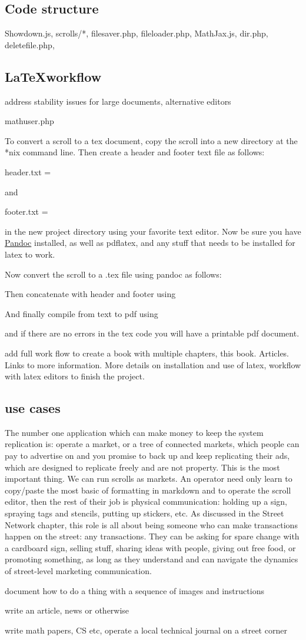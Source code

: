 \subsection{Code structure}\label{code-structure}

Showdown.js, scrolls/*, filesaver.php, fileloader.php, MathJax.js,
dir.php, deletefile.php,

\subsection{\LaTeX workflow}\label{latex-workflow}

address stability issues for large documents, alternative editors

mathuser.php

To convert a scroll to a tex document, copy the scroll into a new
directory at the *nix command line. Then create a header and footer text
file as follows:

header.txt =

and

footer.txt =

in the new project directory using your favorite text editor. Now be
sure you have \href{https://pandoc.org/}{Pandoc} installed, as well as
pdflatex, and any stuff that needs to be installed for latex to work.

Now convert the scroll to a .tex file using pandoc as follows:

Then concatenate with header and footer using

And finally compile from text to pdf using

and if there are no errors in the tex code you will have a printable pdf
document.

add full work flow to create a book with multiple chapters, this book.
Articles. Links to more information. More details on installation and
use of latex, workflow with latex editors to finish the project.

\subsection{use cases}

The number one application which can make money to keep the system replication is: operate a market, or a tree of connected markets, which people can pay to advertise on and you promise to back up and keep replicating their ads, which are designed to replicate freely and are not property.  This is the most important thing.  We can run scrolls as markets.  An operator need only learn to copy/paste the most basic of formatting in markdown and to operate the scroll editor, then the rest of their job is physical communication: holding up a sign, spraying tags and stencils, putting up stickers, etc.  As discussed in the Street Network chapter, this role is all about being someone who can make transactions happen on the street: any transactions.  They can be asking for spare change with a cardboard sign, selling stuff, sharing ideas with people, giving out free food, or promoting something, as long as they understand and can navigate the dynamics of street-level marketing communication.

document how to do a thing with a sequence of images and instructions

write an article, news or otherwise


write math papers, CS etc, operate a local technical journal on a street corner

